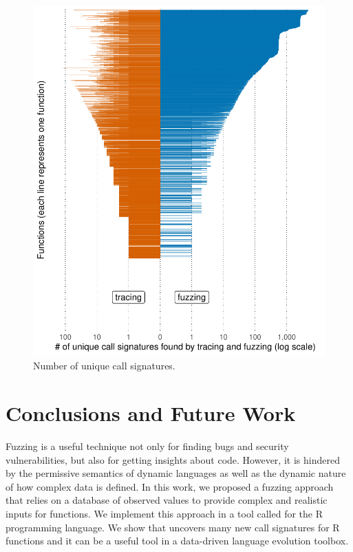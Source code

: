 \documentclass[sigplan,nonacm,anonymous,review]{acmart}
\begin{document}
\begin{figure}
    \centering
    \includegraphics[width=\columnwidth]{code-and-figures/uf-call-signatures.pdf}
    \caption{Number of unique call signatures.}
    \label{fig:call-signatures}
\end{figure}

\section{Conclusions and Future Work}
\label{sec:conclusions}

Fuzzing is a useful technique not only for finding bugs and security vulnerabilities, but also for getting insights about code.
However, it is hindered by the permissive semantics of dynamic languages as well as the dynamic nature of how complex data is defined.
In this work, we proposed a fuzzing approach that relies on a database of observed values to provide complex and realistic inputs for functions.
We implement this approach in a tool called \tool for the R programming language.
We show that \tool uncovers many new call signatures for R functions and it can be a useful tool in a data-driven language evolution toolbox.
\end{document}
